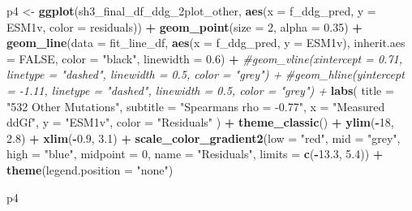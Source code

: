\documentclass[
]{article}
\newenvironment{Shaded}{\begin{snugshade}}{\end{snugshade}}
\newcommand{\AttributeTok}[1]{\textcolor[rgb]{0.13,0.29,0.53}{#1}}
\newcommand{\CommentTok}[1]{\textcolor[rgb]{0.56,0.35,0.01}{\textit{#1}}}
\newcommand{\ConstantTok}[1]{\textcolor[rgb]{0.56,0.35,0.01}{#1}}
\newcommand{\DecValTok}[1]{\textcolor[rgb]{0.00,0.00,0.81}{#1}}
\newcommand{\FloatTok}[1]{\textcolor[rgb]{0.00,0.00,0.81}{#1}}
\newcommand{\FunctionTok}[1]{\textcolor[rgb]{0.13,0.29,0.53}{\textbf{#1}}}
\newcommand{\NormalTok}[1]{#1}
\newcommand{\OtherTok}[1]{\textcolor[rgb]{0.56,0.35,0.01}{#1}}
\newcommand{\SpecialCharTok}[1]{\textcolor[rgb]{0.81,0.36,0.00}{\textbf{#1}}}
\newcommand{\StringTok}[1]{\textcolor[rgb]{0.31,0.60,0.02}{#1}}
\begin{document}
\begin{Shaded}
\begin{Highlighting}[]
\NormalTok{p4 }\OtherTok{\textless{}{-}} \FunctionTok{ggplot}\NormalTok{(sh3\_final\_df\_ddg\_2plot\_other, }\FunctionTok{aes}\NormalTok{(}\AttributeTok{x =}\NormalTok{ f\_ddg\_pred, }\AttributeTok{y =}\NormalTok{ ESM1v, }\AttributeTok{color =}\NormalTok{ residuals)) }\SpecialCharTok{+}
  \FunctionTok{geom\_point}\NormalTok{(}\AttributeTok{size =} \DecValTok{2}\NormalTok{, }\AttributeTok{alpha =} \FloatTok{0.35}\NormalTok{) }\SpecialCharTok{+}
  \FunctionTok{geom\_line}\NormalTok{(}\AttributeTok{data =}\NormalTok{ fit\_line\_df, }\FunctionTok{aes}\NormalTok{(}\AttributeTok{x =}\NormalTok{ f\_ddg\_pred, }\AttributeTok{y =}\NormalTok{ ESM1v),}
            \AttributeTok{inherit.aes =} \ConstantTok{FALSE}\NormalTok{, }\AttributeTok{color =} \StringTok{"black"}\NormalTok{, }\AttributeTok{linewidth =} \FloatTok{0.6}\NormalTok{) }\SpecialCharTok{+}
  \CommentTok{\#geom\_vline(xintercept = 0.71, linetype = "dashed", linewidth = 0.5, color = "grey") +}
  \CommentTok{\#geom\_hline(yintercept = {-}1.11, linetype = "dashed", linewidth = 0.5, color = "grey") +}
  \FunctionTok{labs}\NormalTok{(}
    \AttributeTok{title =} \StringTok{"532 Other Mutations"}\NormalTok{,}
    \AttributeTok{subtitle =} \StringTok{"Spearman\textquotesingle{}s rho = {-}0.77"}\NormalTok{,}
    \AttributeTok{x =} \StringTok{"Measured ddGf"}\NormalTok{,}
    \AttributeTok{y =} \StringTok{"ESM1v"}\NormalTok{,}
    \AttributeTok{color =} \StringTok{"Residuals"}
\NormalTok{  ) }\SpecialCharTok{+}
  \FunctionTok{theme\_classic}\NormalTok{() }\SpecialCharTok{+}
  \FunctionTok{ylim}\NormalTok{(}\SpecialCharTok{{-}}\DecValTok{18}\NormalTok{, }\FloatTok{2.8}\NormalTok{) }\SpecialCharTok{+} \FunctionTok{xlim}\NormalTok{(}\SpecialCharTok{{-}}\FloatTok{0.9}\NormalTok{, }\FloatTok{3.1}\NormalTok{) }\SpecialCharTok{+}
  \FunctionTok{scale\_color\_gradient2}\NormalTok{(}\AttributeTok{low =} \StringTok{"red"}\NormalTok{, }\AttributeTok{mid =} \StringTok{"grey"}\NormalTok{, }\AttributeTok{high =} \StringTok{"blue"}\NormalTok{, }\AttributeTok{midpoint =} \DecValTok{0}\NormalTok{, }\AttributeTok{name =} \StringTok{"Residuals"}\NormalTok{,}
                         \AttributeTok{limits =} \FunctionTok{c}\NormalTok{(}\SpecialCharTok{{-}}\FloatTok{13.3}\NormalTok{, }\FloatTok{5.4}\NormalTok{)) }\SpecialCharTok{+}
  \FunctionTok{theme}\NormalTok{(}\AttributeTok{legend.position =} \StringTok{"none"}\NormalTok{)}

\NormalTok{p4}
\end{Highlighting}
\end{Shaded}
\end{document}
